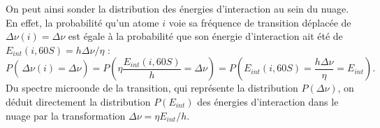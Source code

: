 %
On peut ainsi sonder la distribution des énergies d'interaction au sein du nuage.
En effet, la probabilité qu'un atome $i$ voie sa fréquence de transition déplacée de $\Delta\nu (i) = \Delta \nu$ est égale à la probabilité que son énergie d'interaction ait été de $E_{int}(i,60S) = h\Delta\nu/\eta$ :
\begin{equation}
P\left( \frac{}{} \!\Delta\nu(i)=\Delta\nu \right )
=P \left( \eta\frac{E_{int}(i,60S)}{h} = \Delta\nu \right) = P\left( E_{int}(i,60S) = \frac{h\Delta\nu}{\eta} = E_{int} \right).
\end{equation}
Du spectre microonde de la transition, qui représente la distribution $P(\Delta\nu)$, on déduit directement la distribution $P(E_{int})$ des énergies d'interaction dans le nuage par la transformation $\Delta\nu = \eta E_{int}/h$.


